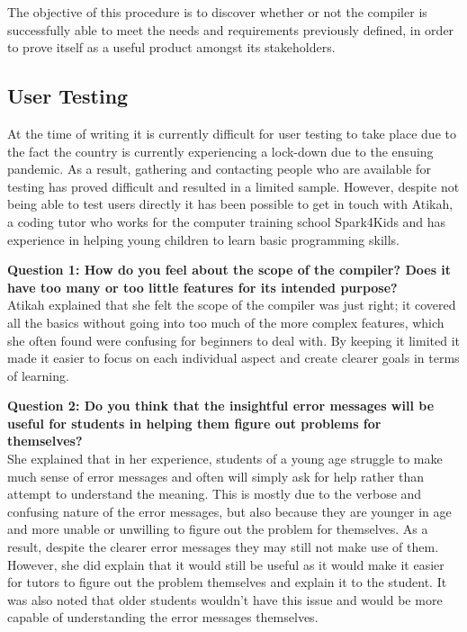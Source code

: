 \documentclass[
]{report}
\begin{document}
The objective of this procedure is to discover whether or not the
compiler is successfully able to meet the needs and requirements
previously defined, in order to prove itself as a useful product amongst
its stakeholders.

\subsection{User Testing}
At the time of writing it is currently difficult for user testing to
take place due to the fact the country is currently experiencing a
lock-down due to the ensuing pandemic. As a result, gathering and
contacting people who are available for testing has proved difficult and
resulted in a limited sample. However, despite not being able to test
users directly it has been possible to get in touch with Atikah, a
coding tutor who works for the computer training school Spark4Kids and
has experience in helping young children to learn basic programming
skills.

\textbf{Question 1: How do you feel about the scope of the compiler?
Does it have too many or too little features for its intended
purpose?}\\
Atikah explained that she felt the scope of the compiler was just right;
it covered all the basics without going into too much of the more
complex features, which she often found were confusing for beginners to
deal with. By keeping it limited it made it easier to focus on each
individual aspect and create clearer goals in terms of learning.

\textbf{Question 2: Do you think that the insightful error messages will
be useful for students in helping them figure out problems for
themselves?}\\
She explained that in her experience, students of a young age struggle
to make much sense of error messages and often will simply ask for help
rather than attempt to understand the meaning. This is mostly due to the
verbose and confusing nature of the error messages, but also because
they are younger in age and more unable or unwilling to figure out the
problem for themselves. As a result, despite the clearer error messages
they may still not make use of them. However, she did explain that it
would still be useful as it would make it easier for tutors to figure
out the problem themselves and explain it to the student. It was also
noted that older students wouldn't have this issue and would be more
capable of understanding the error messages themselves.
\end{document}
